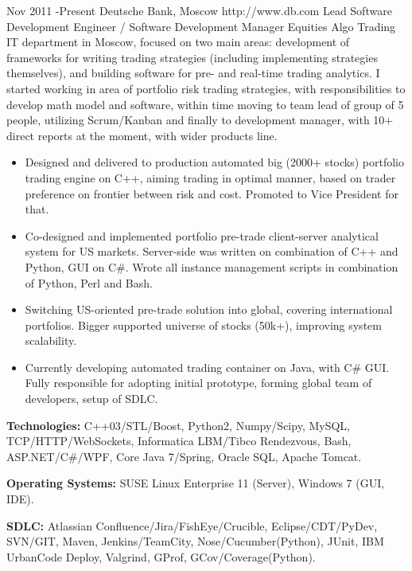 \documentclass[10pt]{article} %
\begin{document}
\job
{Nov 2011 -}{Present}
{Deutsche Bank, Moscow}
{http://www.db.com}
{Lead Software Development Engineer / Software Development Manager}
{Equities Algo Trading IT department in Moscow, focused on two main areas: development of frameworks for
writing trading strategies (including implementing strategies themselves), and building software 
for pre- and real-time  trading analytics. I started working in area of portfolio risk trading strategies,
with responsibilities to develop math model and software, within time moving to team lead of group of 5 people,
utilizing Scrum/Kanban and finally to development manager, with 10+ direct reports at the moment,
with wider products line.}
{\begin{itemize}
\item{Designed and delivered to production automated big (2000+ stocks) portfolio trading engine on C++,
aiming trading in optimal manner, based on trader preference on frontier between risk and cost. 
Promoted to Vice President for that.}
\item{Co-designed and implemented portfolio pre-trade client-server analytical system for US markets.
Server-side was written on combination of C++ and Python, GUI on C\#. Wrote all instance management scripts
in combination of Python, Perl and Bash.}
\item{Switching US-oriented pre-trade solution into global, covering international portfolios.
Bigger supported universe of stocks (50k+), improving system scalability.}
\item{Currently developing automated trading container on Java, with C\# GUI. Fully responsible for
adopting initial prototype, forming global team of developers, setup of SDLC.}
\end{itemize}}
{\rule{0mm}{5mm}\textbf{Technologies:} C++03/STL/Boost, Python2, Numpy/Scipy, MySQL, TCP/HTTP/WebSockets,
Informatica LBM/Tibco Rendezvous, Bash, ASP.NET/C\#/WPF, Core Java 7/Spring, Oracle SQL, Apache Tomcat.\\
\rule{0mm}{5mm}\textbf{Operating Systems:} SUSE Linux Enterprise 11 (Server), Windows 7 (GUI, IDE).\\
\rule{0mm}{5mm}\textbf{SDLC:} Atlassian Confluence/Jira/FishEye/Crucible, Eclipse/CDT/PyDev, SVN/GIT,
Maven, Jenkins/TeamCity, Nose/Cucumber(Python), JUnit, IBM UrbanCode Deploy, Valgrind, GProf, GCov/Coverage(Python).
}

\end{document}
